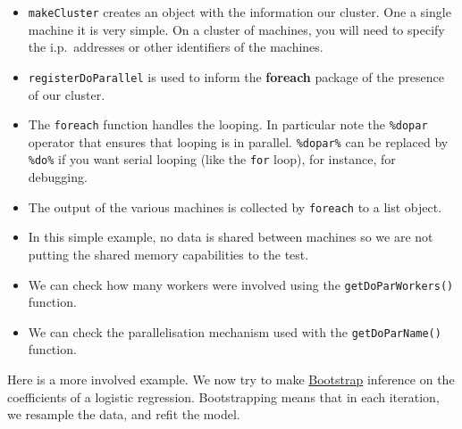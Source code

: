 \documentclass[]{book}
\newenvironment{Shaded}{\begin{snugshade}}{\end{snugshade}}
\newcommand{\KeywordTok}[1]{\textcolor[rgb]{0.13,0.29,0.53}{\textbf{{#1}}}}
\newcommand{\DataTypeTok}[1]{\textcolor[rgb]{0.13,0.29,0.53}{{#1}}}
\newcommand{\DecValTok}[1]{\textcolor[rgb]{0.00,0.00,0.81}{{#1}}}
\newcommand{\FloatTok}[1]{\textcolor[rgb]{0.00,0.00,0.81}{{#1}}}
\newcommand{\StringTok}[1]{\textcolor[rgb]{0.31,0.60,0.02}{{#1}}}
\newcommand{\OtherTok}[1]{\textcolor[rgb]{0.56,0.35,0.01}{{#1}}}
\newcommand{\NormalTok}[1]{{#1}}
\providecommand{\tightlist}{%
  \setlength{\itemsep}{0pt}\setlength{\parskip}{0pt}}
\theoremstyle{definition}
\theoremstyle{definition}
\theoremstyle{remark}
\begin{document}
\begin{itemize}
\tightlist
\item
  \texttt{makeCluster} creates an object with the information our
  cluster. One a single machine it is very simple. On a cluster of
  machines, you will need to specify the i.p.~addresses or other
  identifiers of the machines.
\item
  \texttt{registerDoParallel} is used to inform the \textbf{foreach}
  package of the presence of our cluster.
\item
  The \texttt{foreach} function handles the looping. In particular note
  the \texttt{\%dopar} operator that ensures that looping is in
  parallel. \texttt{\%dopar\%} can be replaced by \texttt{\%do\%} if you
  want serial looping (like the \texttt{for} loop), for instance, for
  debugging.
\item
  The output of the various machines is collected by \texttt{foreach} to
  a list object.
\item
  In this simple example, no data is shared between machines so we are
  not putting the shared memory capabilities to the test.
\item
  We can check how many workers were involved using the
  \texttt{getDoParWorkers()} function.
\item
  We can check the parallelisation mechanism used with the
  \texttt{getDoParName()} function.
\end{itemize}

Here is a more involved example. We now try to make
\href{https://en.wikipedia.org/wiki/Bootstrapping_(statistics)}{Bootstrap}
inference on the coefficients of a logistic regression. Bootstrapping
means that in each iteration, we resample the data, and refit the model.

\begin{Shaded}
\end{Shaded}
\end{document}
